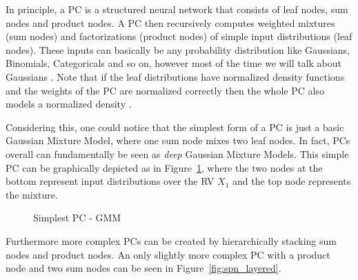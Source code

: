 In principle, a PC is a structured neural network that consists of leaf nodes, sum nodes and product 
nodes. A PC then recursively computes weighted mixtures (sum nodes) and factorizations (product nodes) of simple input distributions (leaf nodes). 
These inputs can basically be any probability distribution like Gaussians, Binomials, Categoricals and so on,
however most of the time we will talk about Gaussians \cite{pc_intro}. Note that if the leaf distributions have normalized density functions and the weights of the PC are
normalized correctly then the whole PC also models a normalized density \cite{pc_intro}.

Considering this, one could notice that the simplest form of a PC is just a basic
Gaussian Mixture Model, where one sum node mixes two leaf nodes. In fact, PCs overall can fundamentally be seen as \emph{deep} Gaussian Mixture Models. 
This simple PC can be graphically depicted as in Figure~\ref{fig:spn_gmm}, where the two nodes at the bottom represent input distributions over the RV $X_1$ and the top node
represents the mixture.

\begin{figure}[h!]
    \centering
    \caption{Simplest PC - GMM}
    \label{fig:spn_gmm}
\end{figure}

Furthermore more complex PCs can be created by hierarchically stacking sum nodes and product nodes.
An only slightly more complex PC with a product node and two sum nodes can be seen in Figure~\ref{fig:spn_layered}. 

